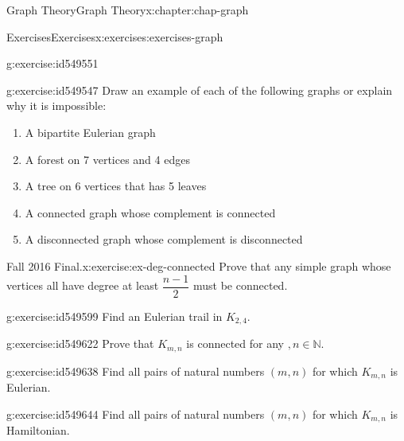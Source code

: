 \documentclass[oneside,10pt,]{book}
\numberwithin{equation}{section}
\begin{document}
\begin{chapterptx}{Graph Theory}{}{Graph Theory}{}{}{x:chapter:chap-graph}
\begin{exercises-section}{Exercises}{}{Exercises}{}{}{x:exercises:exercises-graph}
\begin{divisionexercise}{25}{}{}{g:exercise:id549551}
\begin{sidebyside}{1}{0.38}{0.38}{0}
\begin{sbspanel}{0.24}
{
}%
\end{sbspanel}%
\end{sidebyside}%
\end{divisionexercise}%
\begin{divisionexercise}{26}{}{}{g:exercise:id549547}%
Draw an example of each of the following graphs or explain why it is impossible:%
\begin{enumerate}[label=(\alph*)]
\item{}A bipartite Eulerian graph%
\item{}A forest on 7 vertices and 4 edges%
\item{}A tree on 6 vertices that has 5 leaves%
\item{}A connected graph whose complement is connected%
\item{}A disconnected graph whose complement is disconnected%
\end{enumerate}
%
\end{divisionexercise}%
\begin{divisionexercise}{27}{Fall 2016 Final.}{}{x:exercise:ex-deg-connected}%
Prove that any simple graph whose vertices all have degree at least \(\dfrac{n-1}{2}\) must be connected.%
\end{divisionexercise}%
\begin{divisionexercise}{28}{}{}{g:exercise:id549599}%
Find an Eulerian trail in \(K_{2,4}\).%
\end{divisionexercise}%
\begin{divisionexercise}{29}{}{}{g:exercise:id549622}%
Prove that \(K_{m,n}\) is connected for any \(,n \in \mathbb{N}\).%
\end{divisionexercise}%
\begin{divisionexercise}{30}{}{}{g:exercise:id549638}%
Find all pairs of natural numbers \((m,n)\) for which \(K_{m,n}\) is Eulerian.%
\end{divisionexercise}%
\begin{divisionexercise}{31}{}{}{g:exercise:id549644}%
Find all pairs of natural numbers \((m,n)\) for which \(K_{m,n}\) is Hamiltonian.%
\end{divisionexercise}%

\end{exercises-section}
\end{chapterptx}
\end{document}
